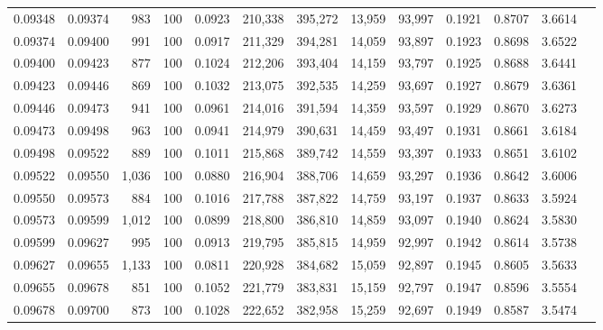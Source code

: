 \begin{tabular}{rrrrrrrrrrrrr}
0.09348 & 0.09374 &   983 & 100 &                                     0.0923 & 210,338 & 395,272 &  13,959 &  93,997 & 0.1921 & 0.8707 & 3.6614 \\
0.09374 & 0.09400 &   991 & 100 &                                     0.0917 & 211,329 & 394,281 &  14,059 &  93,897 & 0.1923 & 0.8698 & 3.6522 \\
0.09400 & 0.09423 &   877 & 100 &                                     0.1024 & 212,206 & 393,404 &  14,159 &  93,797 & 0.1925 & 0.8688 & 3.6441 \\
0.09423 & 0.09446 &   869 & 100 &                                     0.1032 & 213,075 & 392,535 &  14,259 &  93,697 & 0.1927 & 0.8679 & 3.6361 \\
0.09446 & 0.09473 &   941 & 100 &                                     0.0961 & 214,016 & 391,594 &  14,359 &  93,597 & 0.1929 & 0.8670 & 3.6273 \\
0.09473 & 0.09498 &   963 & 100 &                                     0.0941 & 214,979 & 390,631 &  14,459 &  93,497 & 0.1931 & 0.8661 & 3.6184 \\
0.09498 & 0.09522 &   889 & 100 &                                     0.1011 & 215,868 & 389,742 &  14,559 &  93,397 & 0.1933 & 0.8651 & 3.6102 \\
0.09522 & 0.09550 & 1,036 & 100 &                                     0.0880 & 216,904 & 388,706 &  14,659 &  93,297 & 0.1936 & 0.8642 & 3.6006 \\
0.09550 & 0.09573 &   884 & 100 &                                     0.1016 & 217,788 & 387,822 &  14,759 &  93,197 & 0.1937 & 0.8633 & 3.5924 \\
0.09573 & 0.09599 & 1,012 & 100 &                                     0.0899 & 218,800 & 386,810 &  14,859 &  93,097 & 0.1940 & 0.8624 & 3.5830 \\
0.09599 & 0.09627 &   995 & 100 &                                     0.0913 & 219,795 & 385,815 &  14,959 &  92,997 & 0.1942 & 0.8614 & 3.5738 \\
0.09627 & 0.09655 & 1,133 & 100 &                                     0.0811 & 220,928 & 384,682 &  15,059 &  92,897 & 0.1945 & 0.8605 & 3.5633 \\
0.09655 & 0.09678 &   851 & 100 &                                     0.1052 & 221,779 & 383,831 &  15,159 &  92,797 & 0.1947 & 0.8596 & 3.5554 \\
0.09678 & 0.09700 &   873 & 100 &                                     0.1028 & 222,652 & 382,958 &  15,259 &  92,697 & 0.1949 & 0.8587 & 3.5474 \\

\end{tabular}
